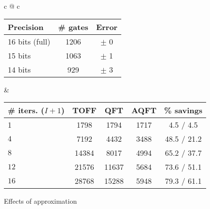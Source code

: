 \begin{figure*}[t]
  {\footnotesize
  \hspace*{-1em}
  \begin{tabular}{c @{\quad} c}
  \begin{minipage}[b]{0.4\textwidth}
  \centering
  \begin{tabular}{|l|c|c|}
    \hline
    Precision & \# gates & Error \\
    \hline
    16 bits (full) & 1206 & $\pm$ 0 \\
    15 bits & 1063 & $\pm$ 1 \\
    14 bits & 929 & $\pm$ 3 \\ \hline
  \end{tabular}
  \end{minipage}
  &
  \begin{minipage}[b]{0.55\textwidth}
  \centering
  \begin{tabular}{|l|c|c|c|c|}
  \hline
  \# iters. ($I+1$) & TOFF & QFT & AQFT & \% savings \\ \hline
  1 & 1798 & 1794 & 1717 & 4.5 / 4.5 \\
  $4$ & 7192 & 4432 & 3488 & 48.5 / 21.2 \\
  $8$ & 14384 & 8017 & 4994 & 65.2 / 37.7 \\
  ${12}$ & 21576 & 11637 & 5684 & 73.6 / 51.1 \\
  ${16}$ & 28768 & 15288 & 5948 & 79.3 / 61.1 \\
  \hline
  \end{tabular}
  \end{minipage}
  \vspace{0.5mm}
  \end{tabular}
  }
  
  \caption{Effects of approximation}
  \label{fig:approx-results}
  \end{figure*}


\label{sec:qft-moder}

